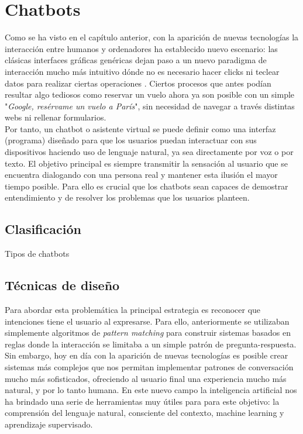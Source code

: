 \section{Chatbots}
Como se ha visto en el capítulo anterior, con la aparición de nuevas tecnologías la interacción entre humanos y ordenadores ha establecido nuevo escenario: las clásicas interfaces gráficas genéricas dejan paso a un nuevo paradigma de interacción mucho más intuitivo dónde no es necesario hacer clicks ni teclear datos para realizar ciertas operaciones \cite{conversationSystems}. Ciertos procesos que antes podían resultar algo tediosos como reservar un vuelo ahora ya son posible con un simple "\textit{Google, resérvame un vuelo a París}", sin necesidad de navegar a través distintas webs ni rellenar formularios.\\

Por tanto, un chatbot o asistente virtual se puede definir como una interfaz (programa) diseñado para que los usuarios puedan interactuar con sus dispositivos haciendo uso de lenguaje natural, ya sea directamente por voz o por texto. El objetivo principal es siempre transmitir la sensación al usuario que se encuentra dialogando con una persona real y mantener esta ilusión el mayor tiempo posible. Para ello es crucial que los chatbots sean capaces de demostrar entendimiento y de resolver los problemas que los usuarios planteen.\\

\subsection{Clasificación}
Tipos de chatbots


\subsection{Técnicas de diseño }
Para abordar esta problemática la principal estrategia es reconocer que intenciones tiene el usuario al expresarse. Para ello, anteriormente se utilizaban simplemente algoritmos de \textit{pattern matching} para construir sistemas basados en reglas donde la interacción se limitaba a un simple patrón de pregunta-respuesta. Sin embargo, hoy en día con la aparición de nuevas tecnologías es posible crear sistemas más complejos que nos permitan implementar patrones de conversación mucho más sofisticados, ofreciendo al usuario final una experiencia mucho más natural, y por lo tanto humana. En este nuevo campo la inteligencia artificial nos ha brindado una serie de herramientas muy útiles para para este objetivo: la comprensión del lenguaje natural, consciente del contexto, machine learning y  aprendizaje supervisado. \\

